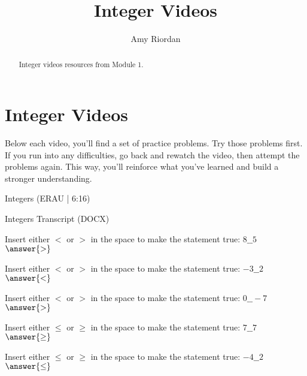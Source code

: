 \documentclass{ximera}
\title{Integer Videos}
\author{Amy Riordan}
\begin{document}
\begin{abstract}
Integer videos resources from Module 1.
\end{abstract}
\maketitle

\section*{Integer Videos}

Below each video, you'll find a set of practice problems. Try those problems first. If you run into any difficulties, go back and rewatch the video, then attempt the problems again. This way, you'll reinforce what you’ve learned and build a stronger understanding.

Integers (ERAU | 6:16)


Integers Transcript (DOCX)


\begin{problem}
Insert either $<$ or $>$ in the space to make the statement true: $8\_\_5$\\
$\answer{>}$
\end{problem}

\begin{problem}
Insert either $<$ or $>$ in the space to make the statement true: $-3\_\_2$\\
$\answer{<}$
\end{problem}

\begin{problem}
Insert either $<$ or $>$ in the space to make the statement true: $0\_\_-7$\\
$\answer{>}$
\end{problem}



\begin{problem}
Insert either $\leq$ or $\geq$ in the space to make the statement true: $7\_\_7$\\
$\answer{\geq}$
\end{problem}

\begin{problem}
Insert either $\leq$ or $\geq$ in the space to make the statement true: $-4\_\_2$\\
$\answer{\leq}$
\end{problem}
\end{document}
